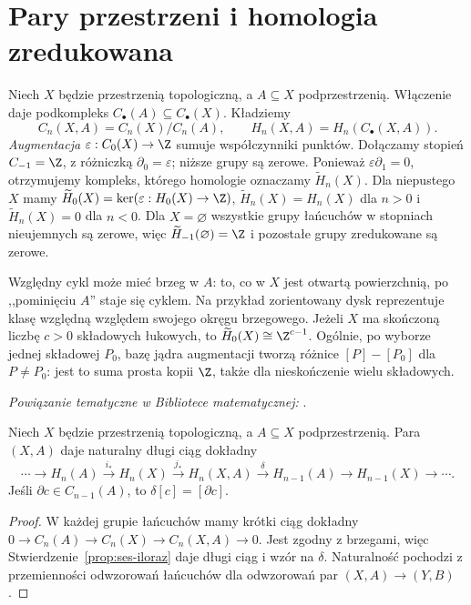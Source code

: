 \section{Pary przestrzeni i homologia zredukowana}
\label{sec:homologia-wzgledna}

\begin{definicja}
\label{def:homologia-wzgledna}
Niech $X$ będzie przestrzenią topologiczną,
a $A\subseteq X$ podprzestrzenią.
Włączenie daje
podkompleks $C_\bullet(A)\subseteq C_\bullet(X)$.
Kładziemy
\[
 C_n(X,A)=C_n(X)/C_n(A),\qquad
 H_n(X,A)=H_n(C_\bullet(X,A)).
\]
\emph{Augmentacja} $\varepsilon:C_0(X)\to\Z$ sumuje
współczynniki punktów. Dołączamy stopień $C_{-1}=\Z$,
z różniczką $\partial_0=\varepsilon$; niższe grupy są zerowe.
Ponieważ $\varepsilon\partial_1=0$, otrzymujemy kompleks,
którego homologie oznaczamy $\widetilde H_n(X)$.
Dla niepustego $X$ mamy
$\widetilde H_0(X)=\ker(\varepsilon:H_0(X)\to\Z)$,
$\widetilde H_n(X)=H_n(X)$ dla $n>0$ i
$\widetilde H_n(X)=0$ dla $n<0$.
Dla $X=\varnothing$ wszystkie grupy łańcuchów w stopniach
nieujemnych są zerowe, więc $\widetilde H_{-1}(\varnothing)=\Z$
i pozostałe grupy zredukowane są zerowe.
\end{definicja}

Względny cykl może mieć brzeg w $A$:
to, co w $X$ jest otwartą powierzchnią,
po ,,pominięciu $A$'' staje się cyklem.
Na przykład zorientowany dysk reprezentuje klasę względną
względem swojego okręgu brzegowego.
Jeżeli $X$ ma skończoną liczbę $c>0$ składowych łukowych,
to $\widetilde H_0(X)\cong\Z^{c-1}$.
Ogólnie, po wyborze jednej składowej $P_0$, bazę jądra
augmentacji tworzą różnice $[P]-[P_0]$ dla $P\ne P_0$:
jest to suma prosta kopii $\Z$, także dla nieskończenie wielu składowych.

\noindent\emph{Powiązanie tematyczne w Bibliotece matematycznej:} .

\begin{twierdzenie}
\label{thm:les-pary}
Niech $X$ będzie przestrzenią topologiczną,
a $A\subseteq X$ podprzestrzenią.
Para $(X,A)$ daje naturalny
długi ciąg dokładny
\begin{equation}\label{eq:les-pary}
 \cdots\to H_n(A)\xrightarrow{i_*}H_n(X)
 \xrightarrow{j_*}H_n(X,A)
 \xrightarrow{\delta}H_{n-1}(A)
 \to H_{n-1}(X)\to\cdots.
\end{equation}
Jeśli $\partial c\in C_{n-1}(A)$,
to $\delta[c]=[\partial c]$.
\end{twierdzenie}
\begin{proof}
W każdej grupie łańcuchów mamy
krótki ciąg dokładny
$0\to C_n(A)\to C_n(X)\to C_n(X,A)\to0$.
Jest zgodny z brzegami, więc
Stwierdzenie~\ref{prop:ses-iloraz}
daje długi ciąg i wzór na $\delta$.
Naturalność pochodzi z przemienności
odwzorowań łańcuchów dla odwzorowań
par $(X,A)\to(Y,B)$.
\end{proof}

